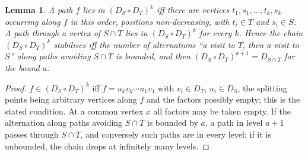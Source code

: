 \documentclass[11pt]{amsart}
\newtheorem{lem}[thm]{Lemma}
\theoremstyle{definition}
\begin{document}
\begin{lem}\label{lem:alt}
A path $f$ lies in $(D_S\circ D_T)^k$ iff there are vertices
$t_1,s_1,\dots,t_k,s_k$ occurring along $f$ in this order, positions
non-decreasing, with $t_i\in T$ and $s_i\in S$. A path through a vertex of
$S\cap T$ lies in $(D_S\circ D_T)^k$ for every $k$. Hence the chain
$(D_S\circ D_T)^k$ stabilises iff the number of alternations ``a visit to
$T$, then a visit to $S$'' along paths avoiding $S\cap T$ is bounded, and
then $(D_S\circ D_T)^{a+1}=D_{S\cap T}$ for the bound $a$.
\end{lem}
\begin{proof}
$f\in(D_S\circ D_T)^k$ iff $f=u_kv_k\cdots u_1v_1$ with $v_i\in D_T$, $u_i\in
D_S$, the splitting points being arbitrary vertices along $f$ and the
factors possibly empty; this is the stated condition. At a common vertex
$x$ all factors may be taken empty. If the alternation along paths
avoiding $S\cap T$ is bounded by $a$, a path in level $a+1$ passes through
$S\cap T$, and conversely such paths are in every level; if it is
unbounded, the chain drops at infinitely many levels.
\end{proof}
\end{document}
